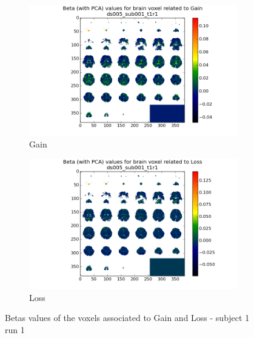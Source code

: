 \begin{figure}[H]
\begin{subfigure}{.5\textwidth}
  \centering
  \includegraphics[width=.95\linewidth]{../fig/mosaic/ds005_sub001_t1r1_withPCA_Gain.png}
  \caption{Gain}
  \label{fig:sfig1}
\end{subfigure}%
\begin{subfigure}{.5\textwidth}
  \centering
  \includegraphics[width=.95\linewidth]{../fig/mosaic/ds005_sub001_t1r1_withPCA_Loss.png}
  \caption{Loss}
  \label{fig:sfig2}
\end{subfigure}
\caption{Betas values of the voxels associated to Gain and Loss - subject 1 run 1}
\label{fig:fig}
\end{figure}

